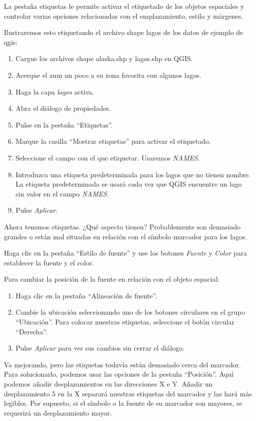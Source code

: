 La pestaña etiquetas le permite activar el etiquetado de los objetos espaciales y controlar varias opciones relacionadas con el emplazamiento, estilo y márgenes.

Ilustraremos esto etiquetando el archivo shape lagos de los datos de ejemplo de qgis:

\begin{enumerate}
\item Cargue los archivos shape alaska.shp y lagos.shp en QGIS.
\item Acerque el zum un poco a su zona favorita con algunos lagos.
\item Haga la capa \textsl{lagos} activa.
\item Abra el diálogo de propiedades.
\item Pulse en la pestaña ``Etiquetas''.
\item Marque la casilla ``Mostrar etiquetas'' para activar el etiquetado.
\item Seleccione el campo con el que etiquetar. Usaremos \textsl{NAMES}.
\item Introduzca una etiqueta predeterminada para los lagos que no tienen nombre. La etiqueta predeterminada se usará cada vez que QGIS encuentre un lago sin valor en el campo \textsl{NAMES}.
\item Pulse \textsl{Aplicar}.
\end{enumerate} 

Ahora tenemos etiquetas. ¿Qué aspecto tienen? Probablemente son demasiado grandes o están mal situadas en relación con el símbolo marcador para los lagos.

Haga clic en la pestaña ``Estilo de fuente'' y use los botones \textsl{Fuente} y \textsl{Color} para establecer la fuente y el color.

Para cambiar la posición de la fuente en relación con el objeto espacial:

\begin{enumerate} 
\item Haga clic en la pestaña ``Alineación de fuente''.
\item Cambie la ubicación seleccionando uno de los botones circulares en el grupo ``Ubicación''. Para colocar nuestras etiquetas, seleccione el botón circular ``Derecha''.
\item Pulse \textsl{Aplicar} para ver sus cambios sin cerrar el diálogo.
\end{enumerate} 

Va mejorando, pero las etiquetas todavía están demasiado cerca del marcador. Para solucionarlo, podemos usar las opciones de la pestaña ``Posición''. Aquí podemos añadir desplazamientos en las direcciones X e Y. Añadir un desplazamiento 5 en la X separará nuestras etiquetas del marcador y las hará más legibles. Por supuesto, si el símbolo o la fuente de su marcador son mayores, se requerirá un desplazamiento mayor.

